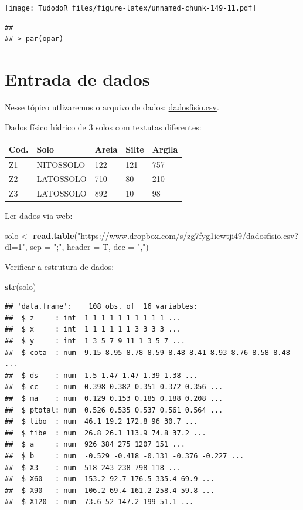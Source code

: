 \documentclass[
]{book}
\newenvironment{Shaded}{\begin{snugshade}}{\end{snugshade}}
\newcommand{\DataTypeTok}[1]{\textcolor[rgb]{0.13,0.29,0.53}{#1}}
\newcommand{\KeywordTok}[1]{\textcolor[rgb]{0.13,0.29,0.53}{\textbf{#1}}}
\newcommand{\NormalTok}[1]{#1}
\newcommand{\StringTok}[1]{\textcolor[rgb]{0.31,0.60,0.02}{#1}}
\begin{document}
\texttt{[image: TudodoR\_files/figure-latex/unnamed-chunk-149-11.pdf]}

\begin{verbatim}
## 
## > par(opar)
\end{verbatim}

\hypertarget{entrada-de-dados-1}{%
\section{Entrada de dados}\label{entrada-de-dados-1}}

Nesse tópico utlizaremos o arquivo de dados: \href{https://www.dropbox.com/s/zg7fyg1iewtji49/dadosfisio.csv?dl=1}{dadosfisio.csv}.

Dados físico hídrico de 3 solos com textutas diferentes:

\begin{longtable}[]{@{}lllll@{}}
\toprule
Cod. & Solo & Areia & Silte & Argila\tabularnewline
\midrule
\endhead
Z1 & NITOSSOLO & 122 & 121 & 757\tabularnewline
Z2 & LATOSSOLO & 710 & 80 & 210\tabularnewline
Z3 & LATOSSOLO & 892 & 10 & 98\tabularnewline
\bottomrule
\end{longtable}

Ler dados via web:

\begin{Shaded}
\begin{Highlighting}[]
\NormalTok{solo <-}\StringTok{ }\KeywordTok{read.table}\NormalTok{(}\StringTok{"https://www.dropbox.com/s/zg7fyg1iewtji49/dadosfisio.csv?dl=1"}\NormalTok{, }\DataTypeTok{sep =} \StringTok{";"}\NormalTok{, }\DataTypeTok{header =}\NormalTok{ T, }\DataTypeTok{dec =} \StringTok{","}\NormalTok{)}
\end{Highlighting}
\end{Shaded}

Verificar a estrutura de dados:

\begin{Shaded}
\begin{Highlighting}[]
\KeywordTok{str}\NormalTok{(solo)}
\end{Highlighting}
\end{Shaded}

\begin{verbatim}
## 'data.frame':    108 obs. of  16 variables:
##  $ z     : int  1 1 1 1 1 1 1 1 1 1 ...
##  $ x     : int  1 1 1 1 1 1 3 3 3 3 ...
##  $ y     : int  1 3 5 7 9 11 1 3 5 7 ...
##  $ cota  : num  9.15 8.95 8.78 8.59 8.48 8.41 8.93 8.76 8.58 8.48 ...
##  $ ds    : num  1.5 1.47 1.47 1.39 1.38 ...
##  $ cc    : num  0.398 0.382 0.351 0.372 0.356 ...
##  $ ma    : num  0.129 0.153 0.185 0.188 0.208 ...
##  $ ptotal: num  0.526 0.535 0.537 0.561 0.564 ...
##  $ tibo  : num  46.1 19.2 172.8 96 30.7 ...
##  $ tibe  : num  26.8 26.1 113.9 74.8 37.2 ...
##  $ a     : num  926 384 275 1207 151 ...
##  $ b     : num  -0.529 -0.418 -0.131 -0.376 -0.227 ...
##  $ X3    : num  518 243 238 798 118 ...
##  $ X60   : num  153.2 92.7 176.5 335.4 69.9 ...
##  $ X90   : num  106.2 69.4 161.2 258.4 59.8 ...
##  $ X120  : num  73.6 52 147.2 199 51.1 ...
\end{verbatim}
\end{document}
